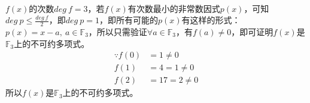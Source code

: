 \begin{solution}\ \\
    $f(x)$的次数$deg\ f=3$，若$f(x)$有次数最小的非常数因式$p(x)$，可知$deg\ p \leq \frac{deg\ f}{2}$，即$deg\ p=1$，即所有可能的$p(x)$有这样的形式：$p(x)=x-a,\ a\in\mathbb{F}_3$，所以只需验证$\forall a\in\mathbb{F}_3$，有$f(a)\neq 0$，即可证明$f(x)$是$\mathbb{F}_3$上的不可约多项式。\\
    \begin{equation*}
        \begin{aligned}
            \because f(0)&=1\neq 0\\
            f(1)&=4=1\neq 0\\
            f(2)&=17=2\neq 0
        \end{aligned}
    \end{equation*}
    所以$f(x)$是$\mathbb{F}_3$上的不可约多项式。
\end{solution}